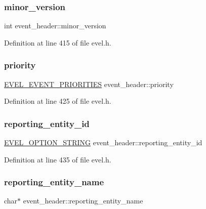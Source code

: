 \subsubsection{\texorpdfstring{minor\+\_\+version}{minor\_version}}
{\footnotesize\ttfamily int event\+\_\+header\+::minor\+\_\+version}



Definition at line 415 of file evel.\+h.

\hypertarget{structevent__header_a864abe4580ddd9c0b86a2df7fa19fbbe}{}\label{structevent__header_a864abe4580ddd9c0b86a2df7fa19fbbe} 
\subsubsection{\texorpdfstring{priority}{priority}}
{\footnotesize\ttfamily \hyperlink{evel_8h_ad1bf6807fa6710332251611207490484}{E\+V\+E\+L\+\_\+\+E\+V\+E\+N\+T\+\_\+\+P\+R\+I\+O\+R\+I\+T\+I\+ES} event\+\_\+header\+::priority}



Definition at line 425 of file evel.\+h.

\hypertarget{structevent__header_aa69fa9a102ba1aa45412f94197cd3a10}{}\label{structevent__header_aa69fa9a102ba1aa45412f94197cd3a10} 
\subsubsection{\texorpdfstring{reporting\+\_\+entity\+\_\+id}{reporting\_entity\_id}}
{\footnotesize\ttfamily \hyperlink{evel_8h_a0de5113a7b72de93c0c7b644f7ea7ec3}{E\+V\+E\+L\+\_\+\+O\+P\+T\+I\+O\+N\+\_\+\+S\+T\+R\+I\+NG} event\+\_\+header\+::reporting\+\_\+entity\+\_\+id}



Definition at line 435 of file evel.\+h.

\hypertarget{structevent__header_a105ed7207010f12bb7ffccf3cb712536}{}\label{structevent__header_a105ed7207010f12bb7ffccf3cb712536} 
\subsubsection{\texorpdfstring{reporting\+\_\+entity\+\_\+name}{reporting\_entity\_name}}
{\footnotesize\ttfamily char$\ast$ event\+\_\+header\+::reporting\+\_\+entity\+\_\+name}



